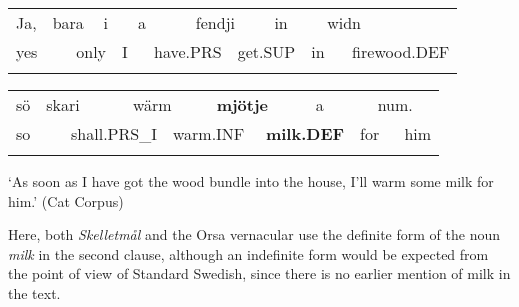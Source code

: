 \begin{tabular}{llllllllllllll}
\lsptoprule
Ja, & \multicolumn{2}{l}{bara

} & \multicolumn{2}{l}{i

} & \multicolumn{2}{l}{a

} & \multicolumn{2}{l}{fendji

} & \multicolumn{2}{l}{in

} & \multicolumn{2}{l}{widn

} & \\
\multicolumn{2}{l}{yes

} & \multicolumn{2}{l}{only

} & \multicolumn{2}{l}{I

} & \multicolumn{2}{l}{have.PRS

} & \multicolumn{2}{l}{get.SUP

} & \multicolumn{2}{l}{in

} & \multicolumn{2}{l}{firewood.DEF

}\\
\lspbottomrule
\end{tabular}

\begin{tabular}{llllllllllll}
\lsptoprule
sö & \multicolumn{2}{l}{skari

} & \multicolumn{2}{l}{wärm

} & \multicolumn{2}{l}{{\bfseries mjötje}

} & \multicolumn{2}{l}{a

} & \multicolumn{2}{l}{num.

} & \\
\multicolumn{2}{l}{so

} & \multicolumn{2}{l}{shall.PRS\_I

} & \multicolumn{2}{l}{warm.INF

} & \multicolumn{2}{l}{{\bfseries milk.DEF}

} & \multicolumn{2}{l}{for

} & \multicolumn{2}{l}{him

}\\
\lspbottomrule
\end{tabular}

\begin{styleTranslation}
‘As soon as I have got the wood bundle into the house, I’ll warm some milk for him.’ (Cat Corpus)

\end{styleTranslation}

\begin{styleBodyTextFirst}
Here, both \textit{Skelletmål} and the Orsa vernacular use the definite form of the noun \textit{milk} in the second clause, although an indefinite form would be expected from the point of view of Standard Swedish, since there is no earlier mention of milk in the text. 

\end{styleBodyTextFirst}

